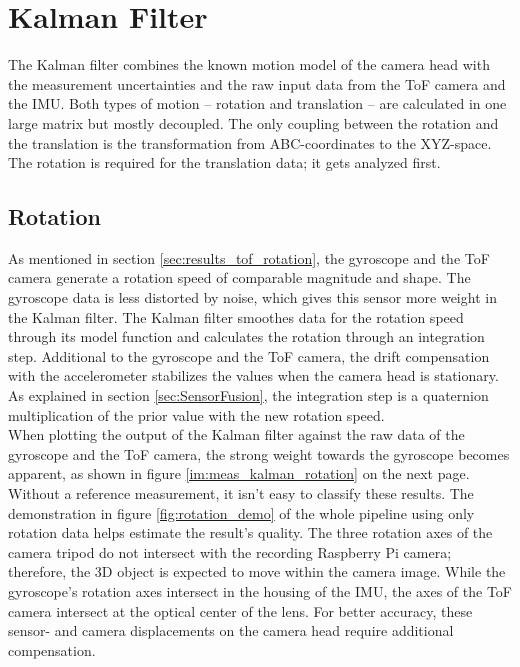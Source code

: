 \section{Kalman Filter}
\label{sec:kalman_results}
The Kalman filter combines the known motion model of the camera head with the measurement uncertainties and the raw input data from the ToF camera and the IMU. Both types of motion – rotation and translation – are calculated in one large matrix but mostly decoupled. The only coupling between the rotation and the translation is the transformation from ABC-coordinates to the XYZ-space. The rotation is required for the translation data; it gets analyzed first.
\subsection{Rotation}
\label{sec:kalman_rotation_results}
As mentioned in section \ref{sec:results_tof_rotation}, the gyroscope and the ToF camera generate a rotation speed of comparable magnitude and shape. The gyroscope data is less distorted by noise, which gives this sensor more weight in the Kalman filter. 
The Kalman filter smoothes data for the rotation speed through its model function and calculates the rotation through an integration step. Additional to the gyroscope and the ToF camera, the drift compensation with the accelerometer stabilizes the values when the camera head is stationary.\\ 
As explained in section \ref{sec:SensorFusion}, the integration step is a quaternion multiplication of the prior value with the new rotation speed.\\
When plotting the output of the Kalman filter against the raw data of the gyroscope and the ToF camera, the strong weight towards the gyroscope becomes apparent, as shown in figure \ref{im:meas_kalman_rotation} on the next page.\\
Without a reference measurement, it isn't easy to classify these results. The demonstration in figure \ref{fig:rotation_demo} of the whole pipeline using only rotation data helps estimate the result's quality. The three rotation axes of the camera tripod do not intersect with the recording Raspberry Pi camera; therefore, the 3D object is expected to move within the camera image. While the gyroscope's rotation axes intersect in the housing of the IMU, the axes of the ToF camera intersect at the optical center of the lens. For better accuracy, these sensor- and camera displacements on the camera head require additional compensation. 
